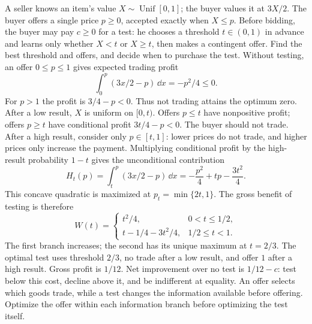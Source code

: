 A seller knows an item's value $X\sim\operatorname{Unif}[0,1]$; the buyer values it at $3X/2$. The buyer offers a single price $p\ge0$, accepted exactly when $X\le p$. Before bidding, the buyer may pay $c\ge0$ for a test: he chooses a threshold $t\in(0,1)$ in advance and learns only whether $X<t$ or $X\ge t$, then makes a contingent offer. Find the best threshold and offers, and decide when to purchase the test.
\solution Without testing, an offer $0\le p\le1$ gives expected trading profit
\[
 \int_0^p(3x/2-p)\,\dd x=-p^2/4\le0.
\]
For $p>1$ the profit is $3/4-p<0$. Thus not trading attains the optimum zero.
After a low result, $X$ is uniform on $[0,t)$. Offers $p\le t$ have nonpositive profit; offers $p\ge t$ have conditional profit $3t/4-p<0$. The buyer should not trade.
After a high result, consider only $p\in[t,1]$: lower prices do not trade, and higher prices only increase the payment. Multiplying conditional profit by the high-result probability $1-t$ gives the unconditional contribution
\[
 H_t(p)=\int_t^p(3x/2-p)\,\dd x
 =-\frac{p^2}{4}+tp-\frac{3t^2}{4}.
\]
This concave quadratic is maximized at $p_t=\min\{2t,1\}$. The gross benefit of testing is therefore
\[
 W(t)=\begin{cases}
 t^2/4,&0<t\le1/2,\\
 t-1/4-3t^2/4,&1/2\le t<1.
 \end{cases}
\]
The first branch increases; the second has its unique maximum at $t=2/3$. The optimal test uses threshold $2/3$, no trade after a low result, and offer $1$ after a high result. Gross profit is $1/12$. Net improvement over no test is $1/12-c$: test below this cost, decline above it, and be indifferent at equality.
\insight An offer selects which goods trade, while a test changes the information available before offering. Optimize the offer within each information branch before optimizing the test itself.
